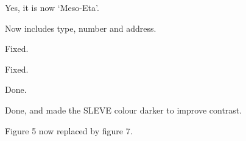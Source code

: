 \documentclass{article}
\begin{document}
\begin{quotation}
\begin{comment}
\item line 414: I assume that `eta' need to be capitalized here, correct?
\end{comment}
\end{quotation}
Yes, it is now `Meso-Eta'.

\begin{quotation}
\begin{comment}
\item Line 428: reference is incomplete
\end{comment}
\end{quotation}
Now includes type, number and address.

\begin{quotation}
\begin{comment}
\item Line 443: `\ldots Eta model \ldots'
\end{comment}
\end{quotation}
Fixed.

\begin{quotation}
\begin{comment}
\item Line 466: `\ldots Cartesian \ldots'
\end{comment}
\end{quotation}
Fixed.

\begin{quotation}
\begin{comment}
\item Table 1: instead of showing these strange numbers like 13.6, -623 and 3480 it would be helpful to say `unstable'.
\end{comment}
\end{quotation}
Done.

\begin{quotation}
\begin{comment}
\item Figure 3: Replot this figure.  The lines need to be thicker, e.g. the SLEVE line is almost invisible.
\end{comment}
\end{quotation}
Done, and made the SLEVE colour darker to improve contrast.

\begin{quotation}
\begin{comment}
\item Figure 5: The BTF $\theta$ line needs to be thicker.
\end{comment}
\end{quotation}
Figure 5 now replaced by figure 7.



\end{document}
